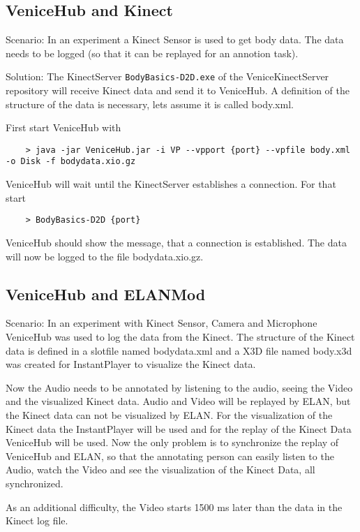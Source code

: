 \documentclass[german,a4paper]{article}
\begin{document}
\subsection{VeniceHub and Kinect}

Scenario: In an experiment a Kinect Sensor is used to get body data. The data needs to be logged (so that it can be replayed for an annotion task).

Solution: The KinectServer \texttt{BodyBasics-D2D.exe} of the VeniceKinectServer repository will receive Kinect data and send it to VeniceHub. A definition of the structure of the data is necessary, lets assume it is called body.xml.

First start VeniceHub with
\begin{lstlisting}
    > java -jar VeniceHub.jar -i VP --vpport {port} --vpfile body.xml -o Disk -f bodydata.xio.gz
\end{lstlisting}

VeniceHub will wait until the KinectServer establishes a connection. For that start
\begin{lstlisting}
    > BodyBasics-D2D {port}
\end{lstlisting}

VeniceHub should show the message, that a connection is established. The data will now be logged to the file bodydata.xio.gz.

\subsection{VeniceHub and ELANMod}

Scenario: In an experiment with Kinect Sensor, Camera and Microphone VeniceHub was used to log the data from the Kinect. The structure of the Kinect data is defined in a slotfile named bodydata.xml and a X3D file named body.x3d was created for InstantPlayer to visualize the Kinect data.

Now the Audio needs to be annotated by listening to the audio, seeing the Video and the visualized Kinect data. Audio and Video will be replayed by ELAN, but the Kinect data can not be visualized by ELAN. For the visualization of the Kinect data the InstantPlayer will be used and for the replay of the Kinect Data VeniceHub will be used. Now the only problem is to synchronize the replay of VeniceHub and ELAN, so that the annotating person can easily listen to the Audio, watch the Video and see the visualization of the Kinect Data, all synchronized.

As an additional difficulty, the Video starts 1500 ms later than the data in the Kinect log file.
\end{document}
